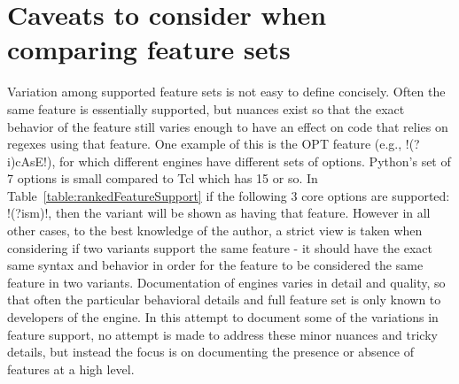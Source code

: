 \section*{Caveats to consider when comparing feature sets}
\label{sec:featureSupportCaveats}
Variation among supported feature sets is not easy to define concisely.  Often the same feature is essentially supported, but nuances exist so that the exact behavior of the feature still varies enough to have an effect on code that relies on regexes using that feature.  One example of this is the OPT feature (e.g., \cverb!(?i)cAsE!), for which different engines have different sets of options.  Python's set of 7 options is small compared to Tcl which has 15 or so.  In Table~\ref{table:rankedFeatureSupport} if the following 3 core options are supported: \cverb!(?ism)!, then the variant will be shown as having that feature.  However in all other cases, to the best knowledge of the author, a strict view is taken when considering if two variants support the same feature - it should have the exact same syntax and behavior in order for the feature to be considered the same feature in two variants.  Documentation of engines varies in detail and quality, so that often the particular behavioral details and full feature set is only known to developers of the engine.  In this attempt to document some of the variations in feature support, no attempt is made to address these minor nuances and tricky details, but instead the focus is on documenting the presence or absence of features at a high level.

